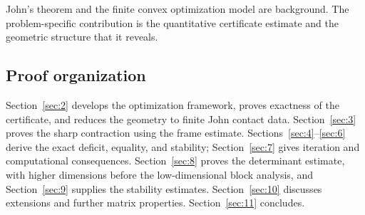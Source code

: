 John's theorem and the finite convex optimization model are background. The problem-specific contribution is the quantitative certificate estimate and the geometric structure that it reveals.

\subsection{Proof organization}\label{sec:1.3}

Section~\ref{sec:2} develops the optimization framework, proves exactness of the
certificate, and reduces the geometry to finite John contact data. Section~\ref{sec:3}
proves the sharp contraction using the frame estimate. Sections~\ref{sec:4}--\ref{sec:6} derive
the exact deficit, equality, and stability; Section~\ref{sec:7} gives iteration and
computational consequences. Section~\ref{sec:8} proves the determinant estimate,
with higher dimensions before the low-dimensional block analysis, and
Section~\ref{sec:9} supplies the stability estimates. Section~\ref{sec:10} discusses extensions
and further matrix properties. Section~\ref{sec:11} concludes.
